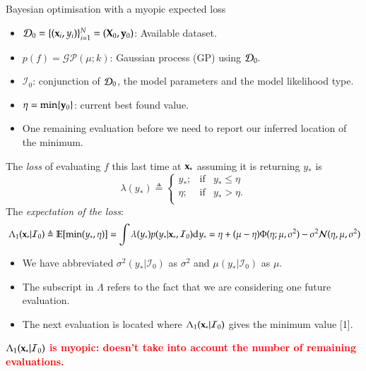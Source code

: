 \documentclass[15pt,serif,mathserif,final]{beamer}
\newcommand{\I}{\mathcal{I}}
\newcommand{\ud}{\mathrm{d}}
\newcommand{\E}{\mathbb{E}}
\begin{document}
\begin{frame}{}
\begin{columns}[t]
\begin{column}{0.32\linewidth}
\begin{block}{Bayesian optimisation with a myopic expected loss}
\begin{itemize}
\item $\dataSet_0 = \{(\latentVector_i,\dataScalar_i)\}_{i=1}^N = (\latentMatrix_0,\dataVector_0)$: Available dataset. 
\item $p(f) = \mathcal{GP}(\mu; k)$: Gaussian process (GP) using $\mathcal{D}_0.$
\item $\I_0$: conjunction of $\mathcal{D}_0$, the model parameters and the model likelihood type.
\item $\eta = \min \{\mathbf{y}_0\}$: current best found value.
\item One remaining evaluation before we need to report our inferred location of the minimum.
\end{itemize}
      
The \textcolor{mycolor}{\emph{loss}} of evaluating $f$ this last time at $\mathbf{x}_*$ assuming it is returning $y_*$ is
$$\lambda(y_*)\triangleq \left\{ \begin{array}{lcl}
y_*;             & \mbox{if}  &  y_* \leq \eta \\
 \eta; & \mbox{if}  & y_* > \eta. \\
\end{array}
\right.$$
The \textcolor{mycolor}{\emph{expectation of the loss}}:
$$\ \Lambda_1(\latentVector_*| \I_0) \triangleq \E[ \min (y_*,\eta)]= \int \lambda(y_*)p(y_* |\latentVector_*,\I_0)\ud y_* =  \eta +(\mu  - \eta) \Phi (\eta ; \mu, \sigma^2) - \sigma^2 \mathcal{N} (\eta, \mu, \sigma^2)$$
\begin{itemize}
\item We have abbreviated $\sigma^2(y_*|\I_0)$ as $\sigma^2$ and $\mu(y_{*}|\I_0)$ as $\mu$. 
\item The subscript in $\Lambda$ refers to the fact that we are considering one future evaluation.  
\item The next evaluation is located  where $\Lambda_1(\latentVector_*| \I_0) $ gives the minimum value [1].
\end{itemize}

 \begin{center}
 \textcolor{red}{\textbf{$\Lambda_1(\latentVector_*| \I_0)$ is myopic: doesn't take into account the number of remaining evaluations.}}
\end{center}


\end{block}
\end{column}
\end{columns}
\end{frame}
\end{document}
